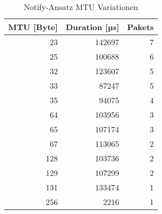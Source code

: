 \begin{table}
\centering
\caption{Notify-Ansatz MTU Variationen}
\label{table:notifydetailmtuchange}
\begin{tabular}{rrr}
\toprule
 MTU [Byte] &  Duration [µs] &  Pakets \\
\midrule
       23 &    142697 &       7 \\
       25 &    100688 &       6 \\
       32 &    123607 &       5 \\
       33 &     87247 &       5 \\
       35 &     94075 &       4 \\
       64 &    103956 &       3 \\
       65 &    107174 &       3 \\
       67 &    113065 &       2 \\
      128 &    103736 &       2 \\
      129 &    107299 &       2 \\
      131 &    133474 &       1 \\
      256 &      2216 &       1 \\
\bottomrule
\end{tabular}
\end{table}
